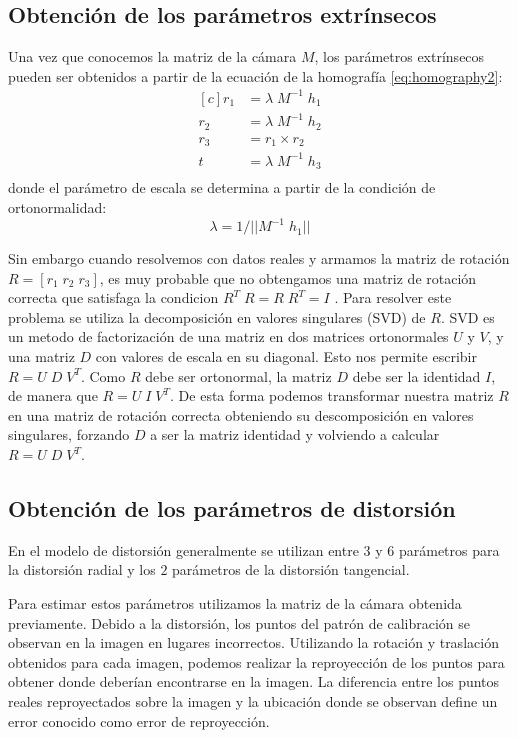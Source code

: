 \subsection{Obtención de los parámetros extrínsecos}\label{subsec:paramExtrinsecos}
Una vez que conocemos la matriz de la cámara $M$, los parámetros extrínsecos pueden ser obtenidos a partir de la ecuación de la homografía \eqref{eq:homography2}:
\begin{equation*}
\begin{aligned}[c]
    r_1 &= \lambda \; M^{-1} \; h_1\\
    r_2 &= \lambda \; M^{-1} \; h_2\\
    r_3 &= r_1 \times r_2\\
    t &= \lambda \; M^{-1} \; h_3\\
\end{aligned}
\end{equation*}
donde el parámetro de escala se determina a partir de la condición de ortonormalidad:
\begin{equation*}
    \lambda = 1 / ||M^{-1} \; h_1||
\end{equation*}

Sin embargo cuando resolvemos con datos reales y armamos la matriz de rotación $R = [r_1 \; r_2 \; r_3]$, es muy probable que no obtengamos una matriz de rotación correcta que satisfaga la condicion $R^T \; R = R \; R^T = I$ \cite{bradski2008learning}.
Para resolver este problema se utiliza la decomposición en valores singulares (SVD) de $R$. SVD es un metodo de factorización de una matriz en dos matrices ortonormales $U$ y $V$, y una matriz $D$ con valores de escala en su diagonal. Esto nos permite escribir $R = U \; D \; V^T$. Como $R$ debe ser ortonormal, la matriz $D$ debe ser la identidad $I$, de manera que $R = U \; I \; V^T$. De esta forma podemos transformar nuestra matriz $R$ en una matriz de rotación correcta obteniendo su descomposición en valores singulares, forzando $D$ a ser la matriz identidad y volviendo a calcular $R = U \; D \; V^T$.

\subsection{Obtención de los parámetros de distorsión}
En el modelo de distorsión generalmente se utilizan entre $3$ y $6$ parámetros para la distorsión radial y los $2$ parámetros de la distorsión tangencial.

Para estimar estos parámetros utilizamos la matriz de la cámara obtenida previamente. Debido a la distorsión, los puntos del patrón de calibración se observan en la imagen en lugares incorrectos. Utilizando la rotación y traslación obtenidos para cada imagen, podemos realizar la reproyección de los puntos para obtener donde deberían encontrarse en la imagen. La diferencia entre los puntos reales reproyectados sobre la imagen y la ubicación donde se observan define un error conocido como error de reproyección.


